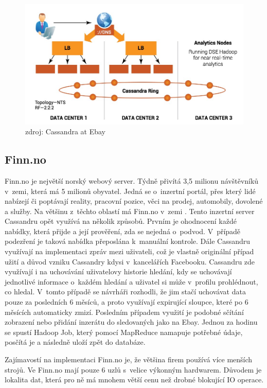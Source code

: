 \begin{figure}[h]
\centering
\includegraphics[scale=0.4]{images/ebay}
\caption{zdroj:  Cassandra at Ebay \cite{ebay}}
\label{fig:timeseries1}
\end{figure}

\subsection{Finn.no}
Finn.no je největší norský webový server. Týdně přivítá 3,5 milionu návštěvníků v~zemi, která má 5 milionů obyvatel. Jedná se o~inzertní portál, přes který lidé nabízejí či poptávají reality, pracovní pozice, věci na prodej, automobily, dovolené a služby. Na většinu z~těchto oblastí má Finn.no v~zemi . Tento inzertní server Cassandru opět využívá na několik způsobů. Prvním je ohodnocení každé nabídky, která přijde a její prověření, zda se nejedná o~podvod. V~případě podezření je taková nabídka přeposlána k~manuální kontrole. Dále Cassandru využívají na implementaci zpráv mezi uživateli, což je vlastně originální případ užití a důvod vzniku Cassandry kdysi v~kancelářích Facebooku. Cassandru zde využívají i na uchovávání uživatelovy historie hledání, kdy se uchovávají jednotlivé informace o~každém hledání a uživatel si může v~profilu prohlédnout, co hledal. V~tomto případě se návrháři rozhodli, že jim stačí uchovávat data pouze za posledních 6 měsíců, a proto využívají expirující sloupce, které po 6 měsících automaticky zmizí. Posledním případem využití je podobné sčítání zobrazení nebo přidání inzerátu do sledovaných jako na Ebay. Jednou za hodinu se spustí Hadoop Job, který pomocí MapReduce namapuje potřebné údaje, posčítá je a následně uloží zpět do databáze.

Zajímavostí na implementaci Finn.no je, že většina firem používá více menších strojů. Ve Finn.no mají pouze 6 uzlů s~velice výkonným hardwarem. Důvodem je lokalita dat, která pro ně má mnohem větší cenu než drobné blokující IO operace. 

